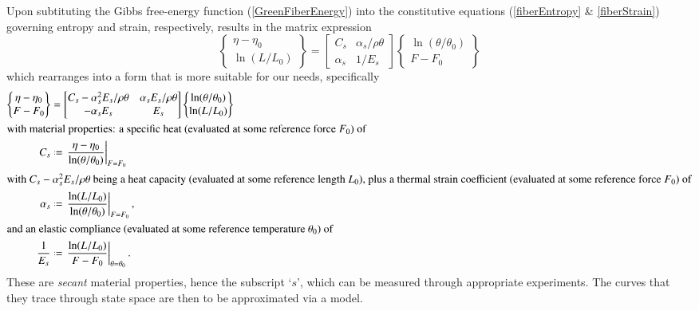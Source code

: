 Upon subtituting the Gibbs free-energy function (\ref{GreenFiberEnergy}) into the constitutive equations (\ref{fiberEntropy} \& \ref{fiberStrain}) governing entropy and strain, respectively, results in the matrix expression
\begin{displaymath}
\left\{ \begin{matrix}
\eta - \eta_0 \\ \ln (L / L_0)
\end{matrix} \right\} = \begin{bmatrix}
C_s & \alpha_s / \rho \theta \\
\alpha_s & 1 / E_s
\end{bmatrix} \left\{ \begin{matrix}
\ln ( \theta / \theta_0 ) \\ F - F_0
\end{matrix} \right\}
\end{displaymath}
which rearranges into a form that is more suitable for our needs, specifically
\begin{subequations}
    \label{HookeanFiberModel}
    \begin{align}
    \left\{ \begin{matrix}
        \eta - \eta_0 \\ F - F_0
    \end{matrix} \right\} & = \begin{bmatrix}
        C_s - \alpha^2_s E_s / \rho \theta & 
        \alpha_s E_s / \rho \theta \\
        -\alpha_s E_s & E_s
    \end{bmatrix} \left\{ \begin{matrix}
        \ln ( \theta / \theta_0 ) \\ \ln (L / L_0)
    \end{matrix} \right\}
    \label{elasticHookeanFiber} \\
    \intertext{with material properties: a specific heat (evaluated at some reference force $F_0$) of}
    C_s & \defeq 
    \left. \frac{\eta - \eta_0}{\ln( \theta / \theta_0 )}
    \right|_{F=F_0} 
    \label{secantSpecificHeat} \\
    \intertext{with $C_s - \alpha^2_s E_s / \rho \theta$ being a heat capacity (evaluated at some reference length $L_0$), plus a thermal strain coefficient (evaluated at some reference force $F_0$) of}
    \alpha_s & \defeq \left. \frac{\ln(L/L_0)}{\ln(\theta/\theta_0)}
    \right|_{F=F_0} ,
    \label{secantThermalExpansion} \\
    \intertext{and an elastic compliance (evaluated at some reference temperature $\theta_0$) of}
    \frac{1}{E_s} & \defeq \left. \frac{\ln(L/L_0)}{F - F_0} \right|_{\theta=\theta_0} .
    \end{align}
\end{subequations}
These are \textit{secant\/} material properties, hence the subscript `$s$', which can be measured through appropriate experiments.  The curves that they trace through state space are then to be approximated via a model.

